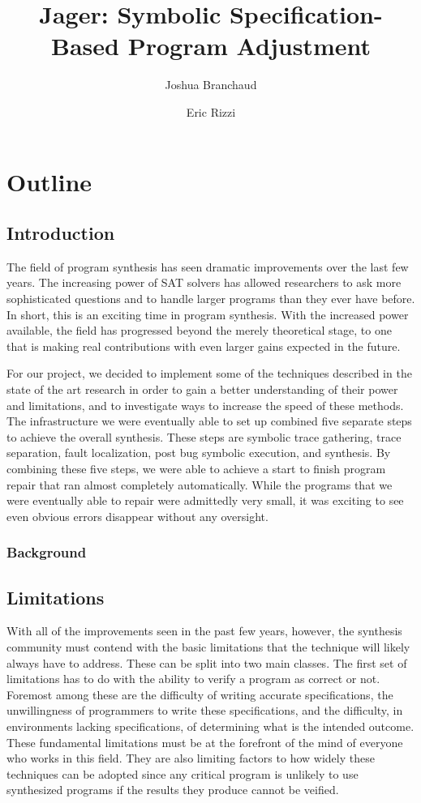 \documentclass[]{article}
\author{Joshua Branchaud \and Eric Rizzi}
\date{}
\begin{document}
\title{Jager: Symbolic Specification-Based Program Adjustment}

\maketitle

\section{Outline}

\subsection{Introduction}
The field of program synthesis has seen dramatic improvements over the last few years.  The increasing power of SAT solvers has allowed researchers to ask more sophisticated questions and to handle larger programs than they ever have before.  In short, this is an exciting time in program synthesis.  With the increased power available, the field has progressed beyond the merely theoretical stage, to one that is making real contributions with even larger gains expected in the future.

For our project, we decided to implement some of the techniques described in the state of the art research in order to gain a better understanding of their power and limitations, and to investigate ways to increase the speed of these methods.  The infrastructure we were eventually able to set up combined five separate steps to achieve the overall synthesis.  These steps are symbolic trace gathering, trace separation, fault localization, post bug symbolic execution, and synthesis.  By combining these five steps, we were able to achieve a start to finish program repair that ran almost completely automatically.  While the programs that we were eventually able to repair were admittedly very small, it was exciting to see even obvious errors disappear without any oversight.

\subsubsection{Background}

\subsection{Limitations}
With all of the improvements seen in the past few years, however, the synthesis community must contend with the basic limitations that the technique will likely always have to address.  These can be split into two main classes.  The first set of limitations has to do with the ability to verify a program as correct or not.  Foremost among these are the difficulty of writing accurate specifications, the unwillingness of programmers to write these specifications, and the difficulty, in environments lacking specifications, of determining what is the intended outcome.  These fundamental limitations must be at the forefront of the mind of everyone who works in this field.  They are also limiting factors to how widely these techniques can be adopted since any critical program is unlikely to use synthesized programs if the results they produce cannot be veified.
\end{document}
